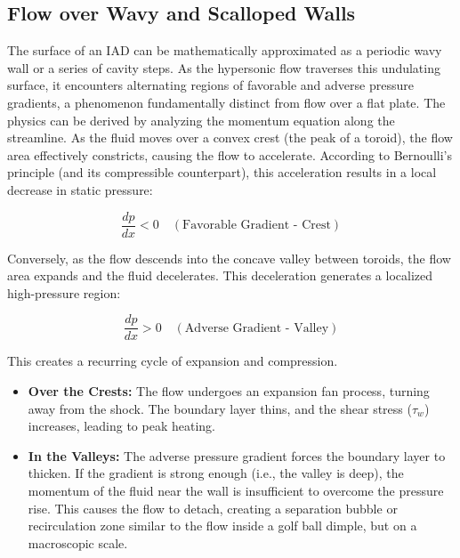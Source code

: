 \subsection{Flow over Wavy and Scalloped Walls}
\par
The surface of an IAD can be mathematically approximated as a periodic wavy wall or a series of cavity steps. As the hypersonic flow traverses this undulating surface, it encounters alternating regions of favorable and adverse pressure gradients, a phenomenon fundamentally distinct from flow over a flat plate.
The physics can be derived by analyzing the momentum equation along the streamline. As the fluid moves over a convex crest (the peak of a toroid), the flow area effectively constricts, causing the flow to accelerate. According to Bernoulli's principle (and its compressible counterpart), this acceleration results in a local decrease in static pressure:

\begin{equation}
    \frac{dp}{dx} < 0 \quad (\text{Favorable Gradient - Crest})
\end{equation}

Conversely, as the flow descends into the concave valley between toroids, the flow area expands and the fluid decelerates. This deceleration generates a localized high-pressure region:

\begin{equation}
    \frac{dp}{dx} > 0 \quad (\text{Adverse Gradient - Valley})
\end{equation}

This creates a recurring cycle of expansion and compression.
\begin{itemize}
    \item \textbf{Over the Crests:} The flow undergoes an expansion fan process, turning away from the shock. The boundary layer thins, and the shear stress ($\tau_w$) increases, leading to peak heating.
    \item \textbf{In the Valleys:} The adverse pressure gradient forces the boundary layer to thicken. If the gradient is strong enough (i.e., the valley is deep), the momentum of the fluid near the wall is insufficient to overcome the pressure rise. This causes the flow to detach, creating a separation bubble or recirculation zone similar to the flow inside a golf ball dimple, but on a macroscopic scale.
\end{itemize}

